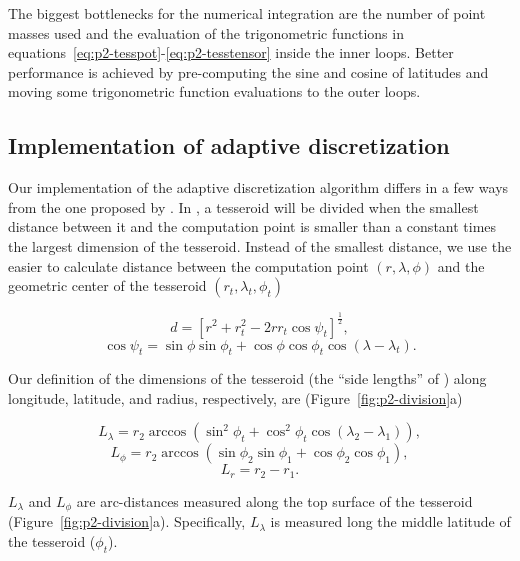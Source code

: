 The biggest bottlenecks for the numerical integration are
the number of point masses used
and the evaluation of the trigonometric functions in
equations~\ref{eq:p2-tesspot}-\ref{eq:p2-tesstensor} inside the inner loops.
Better performance is achieved
by pre-computing the sine and cosine of latitudes
and moving some trigonometric function evaluations
to the outer loops.


\subsection{Implementation of adaptive discretization}

Our implementation of the adaptive discretization algorithm
differs in a few ways from the one proposed by \citet{li2011}.
In \citet{li2011},
a tesseroid will be divided when
the smallest distance between it and the computation point
is smaller than a constant times
the largest dimension of the tesseroid.
Instead of the smallest distance,
we use the easier to calculate
distance between
the computation point $(r, \lambda, \phi)$
and the geometric center of the tesseroid
$(r_t, \lambda_t, \phi_t)$

\begin{equation}
    d = \left[
        r^2 + r_t^2 - 2 r r_t \cos\psi_t
        \right]^{\frac{1}{2}} ,
    \label{eq:p2-distance}
\end{equation}
\begin{equation}
    \cos\psi_t =
        \sin\phi\sin\phi_t + \cos\phi\cos\phi_t\cos(\lambda - \lambda_t) .
\end{equation}

Our definition of the dimensions of the tesseroid
(the ``side lengths'' of \citet{li2011})
along longitude, latitude, and radius, respectively, are
(Figure~\ref{fig:p2-division}a)

\begin{equation}
    L_\lambda = r_2 \arccos(\sin^2\phi_t +
        \cos^2\phi_t\cos(\lambda_2 - \lambda_1)),
    \label{eq:p2-sizelon}
\end{equation}
\begin{equation}
    L_\phi = r_2 \arccos(\sin\phi_2\sin\phi_1 + \cos\phi_2\cos\phi_1),
\end{equation}
\begin{equation}
    L_r = r_2 - r_1.
    \label{eq:p2-sizer}
\end{equation}

\noindent
$L_\lambda$ and $L_\phi$ are arc-distances measured along the top surface of
the tesseroid (Figure~\ref{fig:p2-division}a).
Specifically, $L_\lambda$ is measured long the middle latitude of the
tesseroid ($\phi_t$).

